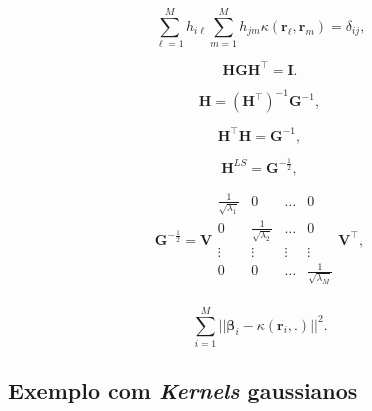\begin{equation}
    \sum_{\ell=1}^{M}h_{i\ell}\sum_{m=1}^{M}h_{jm}\kappa(\mathbf{r}_\ell,\mathbf{r}_m) = \delta_{ij},
\end{equation}

\begin{equation}
    \mathbf{H} \mathbf{G} \mathbf{H}^{\top} = \mathbf{I}.
\end{equation}

\begin{equation}
    \mathbf{H} = \left(\mathbf{H}^{\top}\right)^{-1}\mathbf{G}^{-1},
\end{equation}

\begin{equation}
    \mathbf{H}^{\top}\mathbf{H} = \mathbf{G}^{-1},\label{eq:HtHG-1}
\end{equation}

\begin{equation}
    \mathbf{H}^{LS} = \mathbf{G}^{-\frac{1}{2}},
\end{equation}

\begin{equation}
    \mathbf{G}^{-\frac{1}{2}} = \mathbf{V}\begin{matrix}
        \frac{1}{\sqrt{\lambda_1}} & 0 & \dots & 0\\
        0 & \frac{1}{\sqrt{\lambda_2}} & \dots & 0\\
        \vdots & \vdots & \vdots & \vdots\\
        0 & 0 & \dots & \frac{1}{\sqrt{\lambda_M}}\\
    \end{matrix}\mathbf{V}^{\top},
\end{equation}

\begin{equation}
    \sum_{i=1}^{M} ||\boldsymbol{\beta}_i - \kappa(\mathbf{r}_i,.)||^2.
\end{equation}

\subsection{Exemplo com \textit{Kernels} gaussianos}




